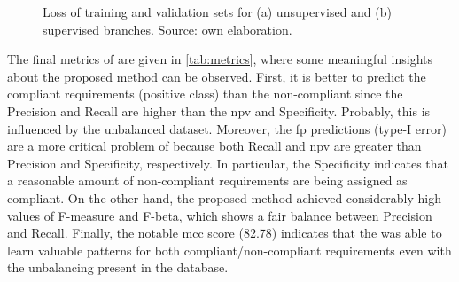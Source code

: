 \begin{figure}[ht]
\centering
{}
\hfill
\ContinuedFloat
{}
\caption{Loss of training and validation sets for (a) unsupervised and (b) supervised branches. Source: own elaboration.}
\label{fig:losses}
\end{figure}

The final metrics of \methodname are given in \autoref{tab:metrics}, where some meaningful insights about the proposed method can be observed. First, it is better to predict the compliant requirements (positive class) than the non-compliant since the Precision and Recall are higher than the \acs{npv} and Specificity. Probably, this is influenced by the unbalanced dataset. Moreover, the \acl{fp} predictions (type-I error) are a more critical problem of \methodname because both Recall and \acs{npv} are greater than Precision and Specificity, respectively. In particular, the Specificity indicates that a reasonable amount of non-compliant requirements are being assigned as compliant. On the other hand, the proposed method achieved considerably high values of F-measure and F-beta, which shows a fair balance between Precision and Recall. Finally, the notable \acs{mcc} score (82.78) indicates that the \methodname was able to learn valuable patterns for both compliant/non-compliant requirements even with the unbalancing present in the \adhoc database.

